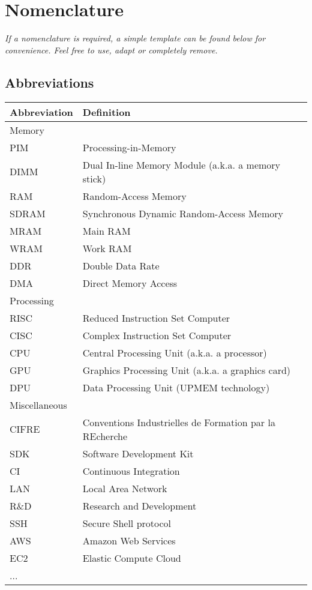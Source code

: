\chapter*{Nomenclature}

\emph{If a nomenclature is required, a simple template can be found below for convenience. Feel free to use, adapt or completely remove.}

\section*{Abbreviations}

\begin{longtable}{p{2.5cm}p{8cm}}
    \toprule
    Abbreviation & Definition \\
    \midrule\midrule\endhead %
    Memory & \\
    \midrule
    PIM & Processing-in-Memory \\
    DIMM & Dual In-line Memory Module (a.k.a. a memory stick) \\
    RAM & Random-Access Memory \\
    SDRAM & Synchronous Dynamic Random-Access Memory \\
    MRAM & Main RAM \\
    WRAM & Work RAM \\
    DDR & Double Data Rate \\
    DMA & Direct Memory Access \\
    \midrule
    Processing & \\
    \midrule
    RISC & Reduced Instruction Set Computer \\
    CISC & Complex Instruction Set Computer \\
    CPU & Central Processing Unit (a.k.a. a processor) \\
    GPU & Graphics Processing Unit (a.k.a. a graphics card) \\
    DPU & Data Processing Unit (UPMEM technology) \\
    \midrule
    Miscellaneous & \\
    \midrule
    CIFRE & Conventions Industrielles de Formation par la REcherche \\
    SDK & Software Development Kit \\
    CI & Continuous Integration \\
    LAN & Local Area Network \\
    R\&D & Research and Development \\
    SSH & Secure Shell protocol \\
    AWS & Amazon Web Services \\
    EC2 & Elastic Compute Cloud \\
    ... \\
    \bottomrule
\end{longtable}

